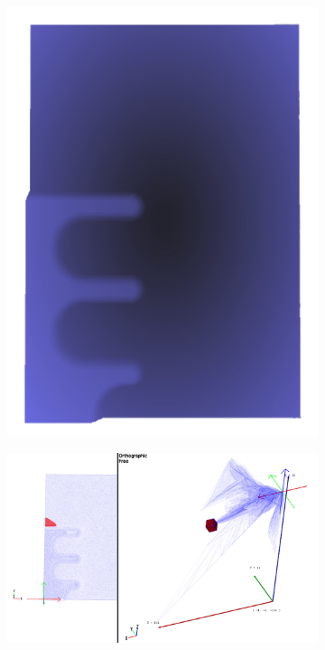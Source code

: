 \documentclass[a4paper,fontsize=12pt,toc=bib,halfparskip,ngerman]{scrartcl}
\begin{document}
\begin{figure}
	\begin{subfigure}{0.2\textwidth}
		\centering
		\includegraphics[width=\textwidth]{pictures/results/Nodel/Nodel_Object.png}
		\subcaption{}
		\label{NodelObject}
	\end{subfigure}
	\hspace*{\fill}
	\begin{subfigure}{0.45\textwidth}
		\centering
		\includegraphics[width=\textwidth]{pictures/results/Nodel/Nodel_Raith.png}

\end{subfigure}
\end{figure}
\end{document}
